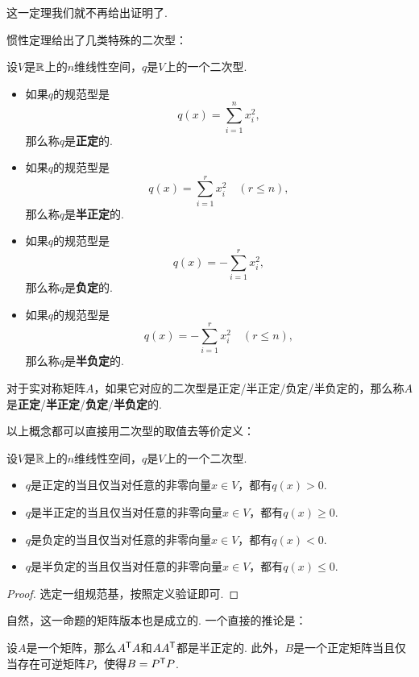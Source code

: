 这一定理我们就不再给出证明了. 

惯性定理给出了几类特殊的二次型：

\begin{definition}\label{def:positive-definite}
    设$V$是$\mathbb{R}$上的$n$维线性空间，$q$是$V$上的一个二次型. 
    \begin{itemize}
        \item 如果$q$的规范型是
        \[
            q(x)=\sum_{i=1}^n x_i^2,
        \]
        那么称$q$是\textbf{正定}的. 
        \item 如果$q$的规范型是
        \[
            q(x)=\sum_{i=1}^r x_i^2\quad(r\leq n),
        \]
        那么称$q$是\textbf{半正定}的. 
        \item 如果$q$的规范型是
        \[
            q(x)=-\sum_{i=1}^r x_i^2,
        \]
        那么称$q$是\textbf{负定}的. 
        \item 如果$q$的规范型是
        \[
            q(x)=-\sum_{i=1}^r x_i^2\quad(r\leq n),
        \]
        那么称$q$是\textbf{半负定}的. 
    \end{itemize}

对于实对称矩阵$A$，如果它对应的二次型是正定/半正定/负定/半负定的，那么称$A$是\textbf{正定}/\textbf{半正定}/\textbf{负定}/\textbf{半负定}的. 
\end{definition}

以上概念都可以直接用二次型的取值去等价定义：
\begin{proposition}\label{prop:positive-definite}
    设$V$是$\mathbb{R}$上的$n$维线性空间，$q$是$V$上的一个二次型. 
    \begin{itemize}
        \item $q$是正定的当且仅当对任意的非零向量$x\in V$，都有$q(x)>0$. 
        \item $q$是半正定的当且仅当对任意的非零向量$x\in V$，都有$q(x)\geq 0$. 
        \item $q$是负定的当且仅当对任意的非零向量$x\in V$，都有$q(x)<0$. 
        \item $q$是半负定的当且仅当对任意的非零向量$x\in V$，都有$q(x)\leq 0$. 
    \end{itemize}
\end{proposition}
\begin{proof}
    选定一组规范基，按照定义验证即可. 
\end{proof}

自然，这一命题的矩阵版本也是成立的. 一个直接的推论是：

\begin{corollary}\label{cor:positive-definite}
设$A$是一个矩阵，那么$A^{\mathsf{T}} A$和$AA^{\mathsf{T}}$都是半正定的. 此外，$B$是一个正定矩阵当且仅当存在可逆矩阵$P$，使得$B=P^{\mathsf{T}} P$.
\end{corollary}


